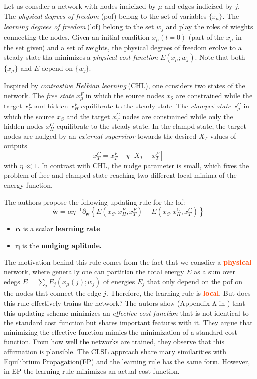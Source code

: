 \documentclass[11pt]{article}
\newcommand{\important}[1]{\textcolor{OrangeRed}{\bf{#1}}}
\begin{document}
Let us consdier a network with nodes indicized by $\mu$ and edges indicized by $j$. The \textit{physical degrees of freedom} (pof) belong to the set of variables $\{ x_{\mu}\}$. The \textit{learning degrees of freedom} (lof) belong to the set $w_j$ and play the roles of wieghts connecting the nodes. Given an initial condition $x_{\mu}(t=0)$ (part of the $x_{\mu}$ in the set given) and a set of weights, the physical degrees of freedom evolve to a steady state tha minimizes a \textit{physical cost function} $E(x_{\mu};w_j)$. Note that both $\{ x_{\mu} \}$ and $E$ depend on $\{ w_j\}$.

Inspired by \textit{contrastive Hebbian learning} (CHL), one considers two states of the network. The \textit{free state} $x_{\mu}^{F}$ in which the source nodes $x_S$ are constrained while the target $x_T^F$ and hidden $x_H^F$ equilibrate to the steady state. The \textit{clamped state} $x_{\mu}^{C}$ in which the source $x_S$ and the target $x_T^C$ nodes are constrained while only the hidden nodes $x_H^C$ equilibrate to the steady state. In the clampd state, the target nodes are nudged by an \textit{external supervisor} towards the desired $X_T$ values of outputs
\[
x_T^{C} = x_{T}^F + \eta \left[ X_T - x_{T}^{F} \right] 
\] 
with $\eta \ll 1$. In contrast with CHL, the nudge parameter is small, which fixes the problem of free and clamped state reaching two different local minima of the energy function.

The authors propose the following updating rule for the lof:
\[
\dot{\mathbf{w}} = \alpha \eta^{-1} \partial_{\mathbf{w}} \left\{ E(x_S, x_{H}^{F}, x_{T}^{F}) - E(x_S, x_{H}^{C}, x_{T}^{C}) \right\}   
\]

\begin{itemize}
    \item $\boldsymbol{\alpha}$ is a scalar \bf{learning rate}
    \item $\boldsymbol{\eta}$ is the \bf{nudging aplitude}.
\end{itemize}

The motivation behind this rule comes from the fact that we consdier a \important{physical} network, where generally one can partition the total energy $E$ as a sum over edegs $E = \sum_{j}E_{j}(x_{\mu}(j);w_j)$ of energies $E_j$ that only depend on the pof on the nodes that connect the edge $j$. Therefore, the learning rule is \important{local}. But does this rule effectively trains the network? The autors show (Appendix A in \cite{Stern}) that this updating scheme minimizes an \textit{effective cost function} that is not identical to the standard cost function but shares important features with it. They argue that minimizing the effective function mimics the minimization of a standard cost function. From how well the networks are trained, they observe that this affirmation is plausible. The CLSL approach share many similarities with Equilibrium Propagation(EP) \cite{} and the learning rule has the same form. However, in EP the learning rule minimizes an actual cost function.
\end{document}
